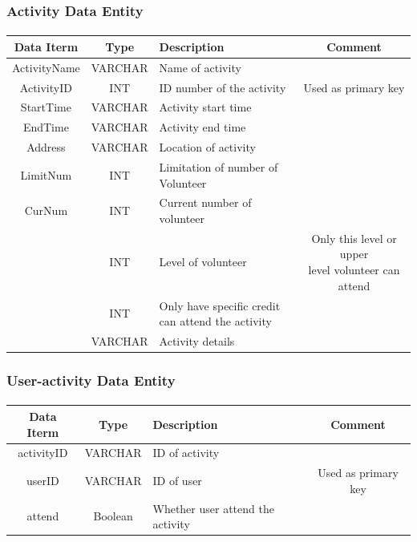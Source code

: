 \documentclass[12pt]{report}
\begin{document}
\subsubsection{Activity Data Entity}
\paragraph{}
\begin{tabular}{|c|c|l|c|}
\hline
Data Iterm & Type & Description & Comment \\
\hline
ActivityName & VARCHAR & Name of activity&\\
\hline
ActivityID & INT & ID number of the activity & Used as primary key \\
\hline
StartTime &
VARCHAR &
Activity start time&
 \\
\hline
EndTime &
VARCHAR &
Activity end time&
 \\
\hline
Address &
VARCHAR &
Location of activity&
\\
\hline 
LimitNum &
INT &
Limitation of number of Volunteer&
\\
\hline
CurNum &
INT &
Current number of volunteer &\\
\hline
\multirow{12}{*}{} 
LimitStatus &
INT &
Level of volunteer &
\makecell[l]{Only this level or upper \\level volunteer can attend} \\
\hline
\multirow{12}{*}{} 
requireCredit &
INT &
\makecell[l]{Only have specific credit\\ can attend the activity} &\\
\hline
Details &
VARCHAR &
Activity details &\\
\hline
\end{tabular}

\subsubsection{User-activity Data Entity}
\paragraph{}
\begin{tabular}{|c|c|l|c|}
\hline
Data Iterm & Type & Description & Comment \\
\hline
activityID &
VARCHAR &
ID of activity &\\
\hline
userID &
VARCHAR  &
ID of user &
Used as primary key \\
\hline
attend &
Boolean &
Whether user attend the activity& \\
\hline
\end{tabular}
\end{document}
